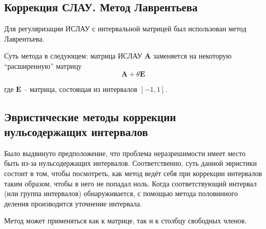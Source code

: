 \subsection{Коррекция СЛАУ. Метод Лаврентьева}

Для регуляризации ИСЛАУ с интервальной матрицей был использован метод Лаврентьева.

Суть метода в следующем: матрица ИСЛАУ $\mathbf{A}$ заменяется на некоторую ``расширенную'' матрицу 
\begin{equation}
\mathbf{A} + \theta \mathbf{E}
\end{equation}

где $\mathbf{E}$ -- матрица, состоящая из интервалов $[-1, 1]$.

\subsection{Эвристические методы коррекции нульсодержащих интервалов}

Было выдвинуто предположение, что проблема неразрешимости имеет место быть из-за нульсодержащих интервалов. Соответственно, суть данной эвристики состоит в том, чтобы посмотреть, как метод ведёт себя при коррекции интервалов таким образом, чтобы в него не попадал ноль. Когда соответствующий интервал (или группа интервалов) обнаруживается, с помощью метода половинного деления производится уточнение интервала.

Метод может применяться как к матрице, так и к столбцу свободных членов.
